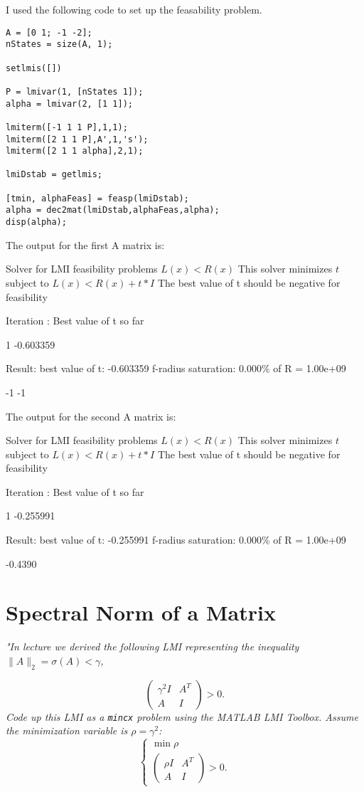 \documentclass[12pt, letterpaper]{article}
\begin{document}
I used the following code to set up the feasability problem.

\begin{lstlisting}[style=matlabstyle]
A = [0 1; -1 -2];
nStates = size(A, 1);

setlmis([])

P = lmivar(1, [nStates 1]);
alpha = lmivar(2, [1 1]);

lmiterm([-1 1 1 P],1,1);
lmiterm([2 1 1 P],A',1,'s');
lmiterm([2 1 1 alpha],2,1);

lmiDstab = getlmis;

[tmin, alphaFeas] = feasp(lmiDstab);
alpha = dec2mat(lmiDstab,alphaFeas,alpha);
disp(alpha);
\end{lstlisting}

The output for the first A matrix is:

Solver for LMI feasibility problems $L(x) < R(x)$
This solver minimizes  $t$  subject to  $L(x) < R(x) + t*I$
The best value of t should be negative for feasibility

Iteration   :    Best value of t so far 

    1                       -0.603359

Result:  best value of t:    -0.603359
        f-radius saturation:  0.000\% of R =  1.00e+09

-1
-1

The output for the second A matrix is:

Solver for LMI feasibility problems $L(x) < R(x)$
This solver minimizes  $t$  subject to  $L(x) < R(x) + t*I$
The best value of t should be negative for feasibility

Iteration   :    Best value of t so far 

 1                       -0.255991

Result:  best value of t:    -0.255991
      f-radius saturation:  0.000\% of R =  1.00e+09

-0.4390

\section{Spectral Norm of a Matrix}

\textit{
    "In lecture we derived the following LMI representing the inequality $\|A\|_2 = \sigma(A) < \gamma$,
}

\[
\begin{pmatrix}
\gamma^2 I & A^T \\
A & I
\end{pmatrix} > 0.
\]
\textit{
Code up this LMI as a \texttt{mincx} problem using the MATLAB LMI Toolbox. Assume the minimization variable is $\rho = \gamma^2$:
}
\[
\begin{cases}
\min \rho \\
\begin{pmatrix}
\rho I & A^T \\
A & I
\end{pmatrix} > 0.
\end{cases}
\]
\end{document}
